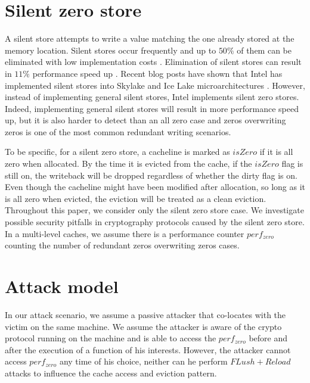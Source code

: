 \documentclass{iacrtrans}
\title[\texttt{iacrtans} class documentation]{\publname}
\subtitle{\LaTeX{} Class Documentation (v. 0.92)}
\begin{document}
\maketitle


\begin{abstract}
  This document is a quick introduction to the \LaTeX{} class for the
  \publname{}.
\end{abstract}

\tableofcontents{}

\section{Silent zero store}
A silent store attempts to write a value matching the one already stored at the memory location. Silent stores occur frequently and up to $50\%$ of them can be eliminated with low implementation costs \cite{lepak2000silent}\cite{bell2000characterization}. Elimination of silent stores can result in $11\%$ performance speed up \cite{lepak2000silent}. Recent blog posts have shown that Intel has implemented silent stores into Skylake and Ice Lake microarchitectures \cite{downs_2020_ice} \cite{downs_2020_hardware}. However, instead of implementing general silent stores, Intel implements silent zero stores. Indeed, implementing general silent stores will result in more performance speed up, but it is also harder to detect than an all zero case and zeros overwriting zeros is one of the most common redundant writing scenarios. 

To be specific, for a silent zero store, a cacheline is marked as $isZero$ if it is all zero when allocated. By the time it is evicted from the cache, if the $isZero$ flag is still on, the writeback will be dropped regardless of whether the dirty flag is on. Even though the cacheline might have been modified after allocation, so long as it is all zero when evicted, the eviction will be treated as a clean eviction. Throughout this paper, we consider only the silent zero store case. We investigate possible security pitfalls in cryptography protocols caused by the silent zero store. In a multi-level caches, we assume there is a performance counter $perf_{zero}$ counting the number of redundant zeros overwriting zeros cases. 

\section{Attack model}
In our attack scenario, we assume a passive attacker that co-locates with the victim on the same machine. We assume the attacker is aware of the crypto protocol running on the machine and is able to access the $perf_{zero}$ before and after the execution of a function of his interests. However, the attacker cannot access $perf_{zero}$ any time of his choice, neither can he perform $FLush+Reload$ attacks to influence the cache access and eviction pattern. 
\end{document}

